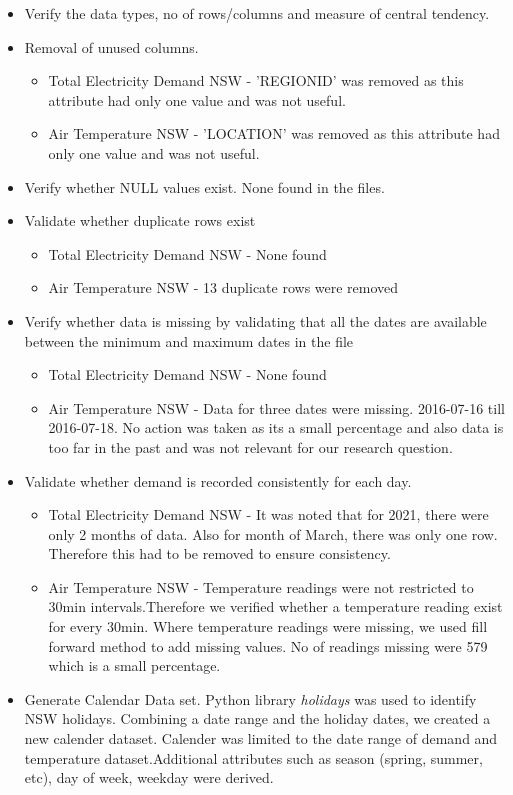 \documentclass[mstat,12pt]{unswthesis}
\begin{document}
\begin{itemize}
  \item Verify the data types, no of rows/columns and measure of central tendency.
  \item Removal of unused columns. 
    \begin{itemize}
      \item Total Electricity Demand NSW - 'REGIONID' was removed as this attribute had only one value and was not useful.
      \item Air Temperature NSW - 'LOCATION' was removed as this attribute had only one value and was not useful.
    \end{itemize}
  \item Verify whether NULL values exist. None found in the files.
  \item Validate whether duplicate rows exist
    \begin{itemize}
      \item Total Electricity Demand NSW - None found
      \item Air Temperature NSW - 13 duplicate rows were removed
    \end{itemize}
  \item Verify whether data is missing by validating that all the dates are available between the minimum and maximum dates in the file
    \begin{itemize}
      \item Total Electricity Demand NSW - None found
      \item Air Temperature NSW - Data for three dates were missing. 2016-07-16 till 2016-07-18. No action was taken as its a small percentage and also data is too far in the past and was not relevant for our research question.
    \end{itemize}
  \item Validate whether demand is recorded consistently for each day. 
    \begin{itemize}
      \item Total Electricity Demand NSW - It was noted that for 2021, there were only 2 months of data. Also for month of March, there was only one row. Therefore this had to be removed to ensure consistency.
      \item Air Temperature NSW - Temperature readings were not restricted to 30min intervals.Therefore we verified whether a temperature reading exist for every 30min. Where temperature readings were missing, we used fill forward method to add missing values. No of readings missing were 579 which is a small percentage.
    \end{itemize}
  \item Generate Calendar Data set. Python library \textit{holidays} was used to identify NSW holidays. Combining a date range and the holiday dates, we created a new calender dataset. Calender was limited to the date range of demand and temperature dataset.Additional attributes such as season (spring, summer, etc), day of week, weekday were derived.
    
\end{itemize}
\end{document}
